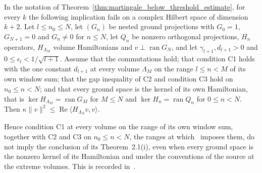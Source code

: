 \begin{theorem}
    \label{thm:martingale_lower_endpoint}
    \leanok
    In the notation of Theorem~\ref{thm:martingale_below_threshold_estimate}, for every
    $k$ the following implication fails on a complex Hilbert space of dimension $k+2$.
    Let $l\le n_0\le N$, let $(G_n)$ be nested ground projections with $G_0=1$,
    $G_{N+1}=0$ and $G_n\neq0$ for $n\le N$, let $Q_n$ be nonzero orthogonal projections,
    $H_n$ operators, $H_{\Lambda_M}$ volume Hamiltonians and $v\perp\operatorname{ran}G_N$,
    and let $\gamma_{l+1},d_{l+1}>0$ and $0\le\epsilon_l<1/\sqrt{l+1}$. Assume that the
    commutations hold; that condition C1 holds with the one constant $d_{l+1}$ at every
    volume $\Lambda_M$ on the range $l\le n<M$ of its own window sum; that the gap
    inequality of C2 and condition C3 hold on $n_0\le n<N$; and that every ground space
    is the kernel of its own Hamiltonian, that is
    $\ker H_{\Lambda_M}=\operatorname{ran}G_M$ for $M\le N$ and
    $\ker H_n=\operatorname{ran}Q_n$ for $0\le n<N$. Then
    $\kappa\lVert v\rVert^2\le\operatorname{Re}\langle H_{\Lambda_N}v,v\rangle$.

    Hence condition C1 at every volume on the range of its own window sum, together
    with C2 and C3 on $n_0\le n<N$, the ranges at which~\cite{Nachtergaele1996Spectral}
    imposes them, do not imply the conclusion of its Theorem~2.1(i), even when every
    ground space is the nonzero kernel of its Hamiltonian and under the conventions of
    the source at the extreme volumes. This is recorded
    in~\cite{gap:nachtergaele96_theorem_2_1_lower_endpoint}.
\end{theorem}
